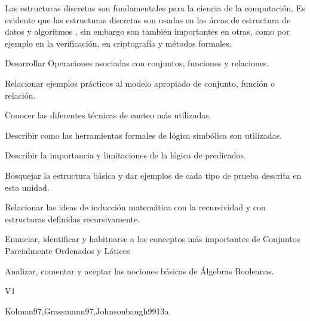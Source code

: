 \begin{syllabus}


\begin{justification}
   Las estructuras discretas son fundamentales para la ciencia de la
   computación. Es evidente que las estructuras discretas son usadas en
   las áreas de estructura de datos y algoritmos , sin embargo son
   también importantes en otras, como por ejemplo en la
   verificación, en criptografía y métodos formales.
   \end{justification}
   
   \begin{goals}
   \item Desarrollar Operaciones asociadas con conjuntos, funciones y relaciones.
   \item Relacionar ejemplos prácticos al modelo apropiado de conjunto, función o relación.
   \item Conocer las diferentes técnicas de conteo más utilizadas.
   \item Describir como las herramientas formales de lógica simbólica son utilizadas.
   \item Describir la importancia y limitaciones de la lógica de predicados.
   \item Bosquejar la estructura básica y dar ejemplos de cada tipo de prueba descrita en esta unidad.
   \item Relacionar las ideas de inducción matemática con la recursividad y con estructuras definidas recursivamente.
   \item Enunciar, identificar y habituarse a los conceptos más importantes de Conjuntos Parcialmente Ordenados y Látices
   \item Analizar, comentar y aceptar las nociones básicas de Álgebras Booleanas.
   \end{goals}
   
   \begin{outcomes}{V1}
      \item {}
      \item {}
      \item {}
   \end{outcomes}
   
   \begin{unit}{\DSSetsRelationsandFunctions}{}{Kolman97,Grassmann97,Johnsonbaugh99}{13}{a}
       \DSSetsRelationsandFunctionsTopicSets
       \DSSetsRelationsandFunctionsAllLearningOutcomes
   \end{unit}
   

\end{syllabus}
